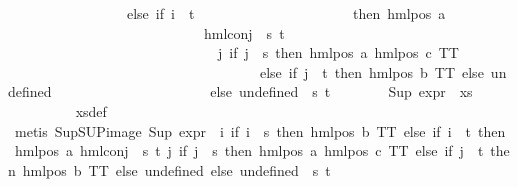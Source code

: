 \begin{isabellebody}
\ \ \ \ \ \ \ \ \ \ \ \ \ \ \ \ \ else\ if\ i\ {\isacharequal}{\kern0pt}\ t\isanewline
\ \ \ \ \ \ \ \ \ \ \ \ \ \ \ \ \ \ \ \ \ \ then\ hml{\isacharunderscore}{\kern0pt}pos\ a\isanewline
\ \ \ \ \ \ \ \ \ \ \ \ \ \ \ \ \ \ \ \ \ \ \ \ \ \ \ \ {\isacharparenleft}{\kern0pt}hml{\isacharunderscore}{\kern0pt}conj\ {\isacharbraceleft}{\kern0pt}{\isacharbraceright}{\kern0pt}\ {\isacharbraceleft}{\kern0pt}s{\isacharcomma}{\kern0pt}\ t{\isacharbraceright}{\kern0pt}\isanewline
\ \ \ \ \ \ \ \ \ \ \ \ \ \ \ \ \ \ \ \ \ \ \ \ \ \ \ \ \ \ {\isacharparenleft}{\kern0pt}{\isasymlambda}j{\isachardot}{\kern0pt}\ if\ j\ {\isacharequal}{\kern0pt}\ s\ then\ hml{\isacharunderscore}{\kern0pt}pos\ a\ {\isacharparenleft}{\kern0pt}hml{\isacharunderscore}{\kern0pt}pos\ c\ TT{\isacharparenright}{\kern0pt}\isanewline
\ \ \ \ \ \ \ \ \ \ \ \ \ \ \ \ \ \ \ \ \ \ \ \ \ \ \ \ \ \ \ \ \ \ \ \ else\ if\ j\ {\isacharequal}{\kern0pt}\ t\ then\ hml{\isacharunderscore}{\kern0pt}pos\ b\ TT\ else\ undefined{\isacharparenright}{\kern0pt}{\isacharparenright}{\kern0pt}\isanewline
\ \ \ \ \ \ \ \ \ \ \ \ \ \ \ \ \ \ \ \ \ \ else\ undefined{\isacharparenright}{\kern0pt}\ {\isacharbackquote}{\kern0pt}\ {\isacharbraceleft}{\kern0pt}s{\isacharcomma}{\kern0pt}\ t{\isacharbraceright}{\kern0pt}{\isacharparenright}{\kern0pt}{\isachardoublequoteclose}\isanewline
\ \ \ \ \ \ \isamarkupfalse%
\ {\isachardoublequoteopen}{\isacharparenleft}{\kern0pt}Sup\ {\isacharparenleft}{\kern0pt}expr{\isacharunderscore}{\kern0pt}{}\ {\isacharbackquote}{\kern0pt}\ xs{\isacharparenright}{\kern0pt}{\isacharparenright}{\kern0pt}\ {\isacharequal}{\kern0pt}\ {}{\isachardoublequoteclose}\ \isanewline
\ \ \ \ \ \ \ \ \isamarkupfalse%
\ xs{\isacharunderscore}{\kern0pt}def\isanewline
\ \ \ \ \ \ \ \ \isamarkupfalse%
\ {\isacharparenleft}{\kern0pt}metis\ Sup{\isachardot}{\kern0pt}SUP{\isacharunderscore}{\kern0pt}image\ {\isacartoucheopen}Sup\ {\isacharparenleft}{\kern0pt}{\isacharparenleft}{\kern0pt}expr{\isacharunderscore}{\kern0pt}{}\ {\isasymcirc}\ {\isacharparenleft}{\kern0pt}{\isasymlambda}i{\isachardot}{\kern0pt}\ if\ i\ {\isacharequal}{\kern0pt}\ s\ then\ hml{\isacharunderscore}{\kern0pt}pos\ b\ TT\ else\ if\ i\ {\isacharequal}{\kern0pt}\ t\ then\ hml{\isacharunderscore}{\kern0pt}pos\ a\ {\isacharparenleft}{\kern0pt}hml{\isacharunderscore}{\kern0pt}conj\ {\isacharbraceleft}{\kern0pt}{\isacharbraceright}{\kern0pt}\ {\isacharbraceleft}{\kern0pt}s{\isacharcomma}{\kern0pt}\ t{\isacharbraceright}{\kern0pt}\ {\isacharparenleft}{\kern0pt}{\isasymlambda}j{\isachardot}{\kern0pt}\ if\ j\ {\isacharequal}{\kern0pt}\ s\ then\ hml{\isacharunderscore}{\kern0pt}pos\ a\ {\isacharparenleft}{\kern0pt}hml{\isacharunderscore}{\kern0pt}pos\ c\ TT{\isacharparenright}{\kern0pt}\ else\ if\ j\ {\isacharequal}{\kern0pt}\ t\ then\ hml{\isacharunderscore}{\kern0pt}pos\ b\ TT\ else\ undefined{\isacharparenright}{\kern0pt}{\isacharparenright}{\kern0pt}\ else\ undefined{\isacharparenright}{\kern0pt}{\isacharparenright}{\kern0pt}\ {\isacharbackquote}{\kern0pt}\ {\isacharbraceleft}{\kern0pt}s{\isacharcomma}{\kern0pt}\ t{\isacharbraceright}{\kern0pt}{\isacharparenright}{\kern0pt}\ {\isacharequal}{\kern0pt}\ {}{\isacartoucheclose}{\isacharparenright}{\kern0pt}\isanewline

\end{isabellebody}
